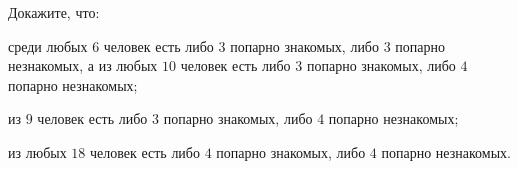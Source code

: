 Докажите, что:
\begin{enumcyr}
    \item среди любых $6$ человек есть либо $3$ попарно знакомых, либо $3$ попарно незнакомых, а из любых $10$ человек есть
	    либо $3$ попарно знакомых, либо $4$ попарно незнакомых;
    \item из $9$ человек есть либо $3$ попарно знакомых, либо $4$ попарно незнакомых;
    \item из любых $18$ человек есть либо $4$ попарно знакомых, либо $4$ попарно незнакомых.
\end{enumcyr}